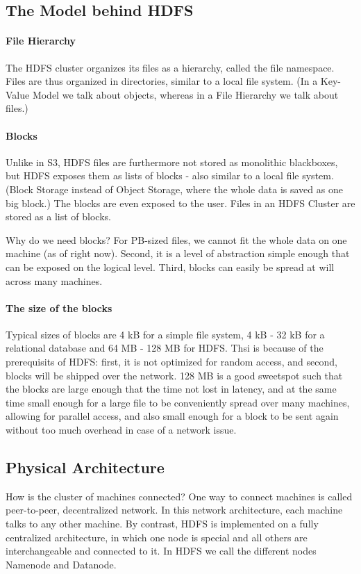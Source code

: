 \subsection{The Model behind HDFS}

\paragraph{File Hierarchy}
The HDFS cluster organizes its files as a hierarchy, called the file namespace. Files are thus organized in directories, similar to a local file system. (In a Key-Value Model we talk about objects, whereas in a File Hierarchy we talk about files.)

\paragraph{Blocks}
Unlike in S3, HDFS files are furthermore not stored as monolithic blackboxes, but HDFS exposes them as lists of blocks - also similar to a local file system. (Block Storage instead of Object Storage, where the whole data is saved as one big block.) The blocks are even exposed to the user. Files in an HDFS Cluster are stored as a list of blocks.

Why do we need blocks? For PB-sized files, we cannot fit the whole data on one machine (as of right now). Second, it is a level of abstraction simple enough that can be exposed on the logical level. Third, blocks can easily be spread at will across many machines.

\paragraph{The size of the blocks}
Typical sizes of blocks are 4 kB for a simple file system, 4 kB - 32 kB for a relational database and 64 MB - 128 MB for HDFS. Thsi is because of the prerequisits of HDFS: first, it is not optimized for random access, and second, blocks will be shipped over the network. 128 MB is a good sweetspot such that the blocks are large enough that the time not lost in latency, and at the same time small enough for a large file to be conveniently spread over many machines, allowing for parallel access, and also small enough for a block to be sent again without too much overhead in case of a network issue.


\subsection{Physical Architecture}
How is the cluster of machines connected? One way to connect machines is called peer-to-peer, decentralized network. In this network architecture, each machine talks to any other machine. By contrast, HDFS is implemented on a fully centralized architecture, in which one node is special and all others are interchangeable and connected to it. In HDFS we call the different nodes Namenode and Datanode.

